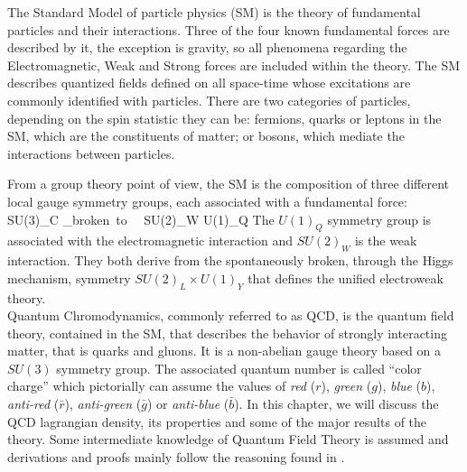 The Standard Model of particle physics (SM) is the theory of fundamental particles and their interactions. Three of the four known fundamental forces are described by it, the exception is gravity, so all phenomena regarding the Electromagnetic, Weak and Strong forces are included within the theory. The SM describes quantized fields defined on all space-time whose excitations are commonly identified with particles. There are two categories of particles, depending on the spin statistic they can be: fermions, quarks or leptons in the SM, which are the constituents of matter; or bosons, which mediate the interactions between particles.\\
\begin{center}
  
\end{center}
From a group theory point of view, the SM is the composition of three different local gauge symmetry groups, each associated with a fundamental force:
\beq
    SU(3)_C \times {}_{broken~to~~ SU(2)_W \times U(1)_{Q}}
\eeq
The $U(1)_{Q}$ symmetry group is associated with the electromagnetic interaction and $SU(2)_{W}$ is the weak interaction. They both derive from the spontaneously broken, through the Higgs mechanism, symmetry $SU(2)_L \times U(1)_{Y}$ that defines the unified electroweak theory. \\ 
Quantum Chromodynamics, commonly referred to as QCD, is the quantum field theory, contained in the SM, that describes the behavior of strongly interacting matter, that is quarks and gluons. It is a non-abelian gauge theory based on a $SU(3)$ symmetry group. The associated quantum number is called ``color charge'' which pictorially can assume the values of \textit{red} ($r$), \textit{green} ($g$), \textit{blue} ($b$), \textit{anti-red} ($\bar r$), \textit{anti-green} ($\bar g$) or \textit{anti-blue} ($\bar b$). In this chapter, we will discuss the QCD lagrangian density, its properties and some of the major results of the theory. Some intermediate knowledge of Quantum Field Theory is assumed and derivations and proofs mainly follow the reasoning found in \cite{peskin}. 

